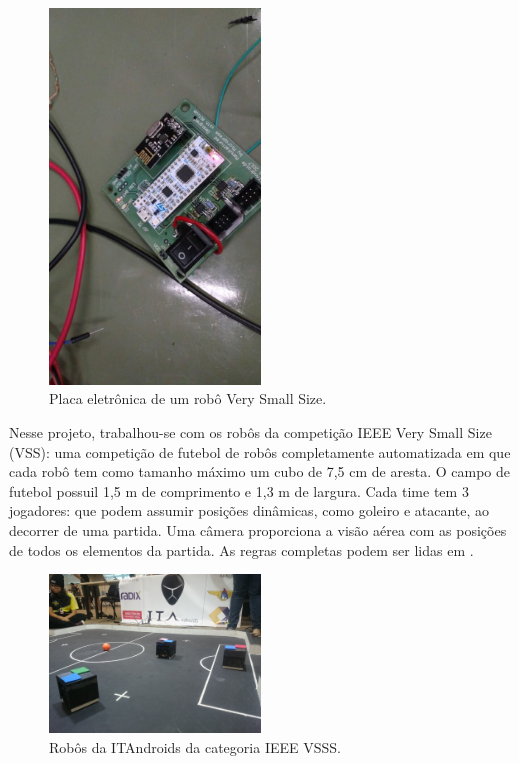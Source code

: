 \documentclass[a4paper,12pt]{article}
\begin{document}
\begin{figure}[H]
	\centering
	\includegraphics[width=0.5\textwidth]{figures/vss_ele.jpg}
   \caption{Placa eletrônica de um robô Very Small Size.} \label{fig:vss_ele}
\end{figure}

Nesse projeto, trabalhou-se com os robôs da competição IEEE Very Small Size (VSS): uma competição de futebol de robôs completamente automatizada em que cada robô tem como tamanho máximo um cubo de 7,5 cm de aresta. O campo de futebol possuil 1,5 m de comprimento e 1,3 m de largura. Cada time tem 3 jogadores: que podem assumir posições dinâmicas, como goleiro e atacante, ao decorrer de uma partida. Uma câmera proporciona a visão aérea com as posições de todos os elementos da partida. As regras completas podem ser lidas em \cite{cbr2008}.

\begin{figure}[H]
	\centering
	\includegraphics[width=0.5\textwidth]{figures/vss.JPG}
   \caption{Robôs da ITAndroids da categoria IEEE VSSS.} \label{fig:vss}
\end{figure}
\end{document}
